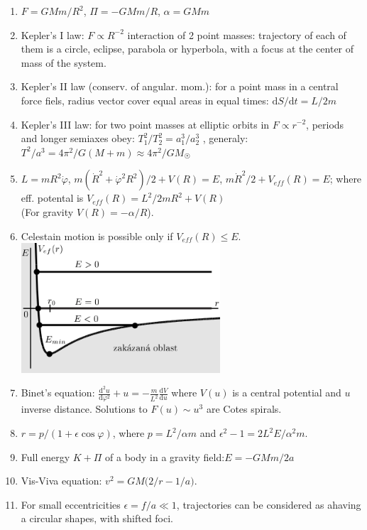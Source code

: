 \documentclass{article}
\renewcommand\d{\mathrm d}
\begin{document}
\begin{multicols}{3}
        \begin{enumerate}
            \item $F=GMm/R^2$, $\Pi=-GMm/R$, $\alpha=GMm$
            \item Kepler's I law: $F\propto R^{-2}$ interaction of 2 point masses: trajectory of each of them is a circle, eclipse, parabola or hyperbola, with a focus at the center of mass of the system.
            \item Kepler's II law (conserv. of angular. mom.): for a point mass in a central force fiels, radius vector cover equal areas in equal times: $\d S/\d t=L/2m$
            \item Kepler's III law: for two point masses at elliptic orbits in $F\propto r^{-2}$, periods and longer semiaxes obey: $T_1^2/T_2^2=a_1^3/a_2^3$ , generaly: $T^2/a^3=4\pi^2/G(M+m)\approx 4\pi^2/GM_{\astrosun}$
            \item $L=mR^2\dot\varphi$, $m\left(\dot R^2+\dot\varphi^2R^2\right)/2+V(R)=E$, $m\dot R^2/2+V_{eff}(R)=E$; where eff. potental is $V_{eff}(R)=L^2/2mR^2+V(R)$\\ (For gravity $V(R)=-\alpha/R$).
            \item Celestain motion is possible only if $V_{eff}(R)\leq E$.
            {
                \centering
                \includegraphics[width=210pt]{plot_1.png}
            }
            \item Binet's equation: $\frac{\d^2u}{\d\varphi^2} +u=-\frac{m}{L^2}\frac{\d V}{\d u}$ where $V(u)$ is a central potential and $u$ inverse distance. Solutions to $F(u)\sim u^3$ are Cotes spirals.
            \item $r=p/(1+\epsilon\cos\varphi)$, where $p=L^2/\alpha m$ and $\epsilon^2-1=2L^2E/\alpha^2m$.
            \item Full energy $K+\Pi$ of a body in a gravity field:$E=-GMm/2a$
            \item Vis-Viva equation: $v^2=GM\big(2/r - 1/a\big)$.
            \item For small eccentricities $\epsilon=f/a\ll 1$, trajectories can be considered as ahaving a circular shapes, with shifted foci.

\end{enumerate}
\end{multicols}
\end{document}
